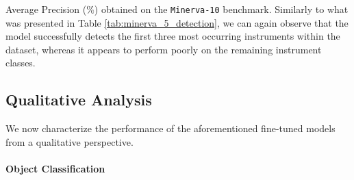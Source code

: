 \begin{table}
	\caption{Average Precision ($\%$) obtained on the \texttt{Minerva-10} benchmark. Similarly to what was presented in Table \ref{tab:minerva_5_detection}, we can again observe that the model successfully detects the first three most occurring instruments within the dataset, whereas it appears to perform poorly on the remaining instrument classes.}
\resizebox{\columnwidth}{!}{%
}
\label{table:minerva_10_detection}
\end{table}





\begin{figure}[htb!]
	\scalebox{0.8}{}
	\caption{}
	\label{fig:detection_experiment_2}
\end{figure}



\begin{figure}[htb!]
	\scalebox{0.8}{}
	\caption{}
	\label{fig:detection_experiment_3}
\end{figure}


\begin{figure}[htb!]
	\scalebox{0.8}{}
	\caption{}
	\label{fig:detection_experiment_4}
\end{figure}




\subsection{Qualitative Analysis}
We now characterize the performance of the aforementioned fine-tuned models from a qualitative perspective. 

\paragraph{Object Classification}


